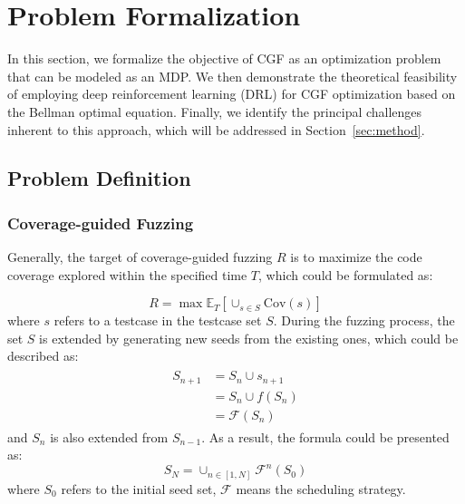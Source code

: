 \documentclass[lettersize,journal]{IEEEtran}
\begin{document}
\newpage



\section{Problem Formalization}\label{sec:background}

In this section, we formalize the objective of CGF as an optimization problem that can be modeled as an MDP. We then demonstrate the theoretical feasibility of employing deep reinforcement learning (DRL) for CGF optimization based on the Bellman optimal equation. Finally, we identify the principal challenges inherent to this approach, which will be addressed in Section \ref{sec:method}. 

\subsection{Problem Definition}

\subsubsection{Coverage-guided Fuzzing}

Generally, the target of coverage-guided fuzzing $R$ is to maximize the code coverage explored within the specified time $T$, which could be formulated as:

\begin{equation}
	R = \max \mathbb{E}_{T}\left[\cup_{s\in S}\text{Cov}(s)\right]\label{eq:cgf_target}
\end{equation}
where $s$ refers to a testcase in the testcase set $S$. During the fuzzing process, the set $S$ is extended by generating new seeds from the existing ones, which could be described as:
\begin{align}
	\begin{split}
		S_{n+1} &= S_{n}\cup s_{n+1} \\
		&= S_n\cup f(S_{n}) \\
		&= \mathcal{F}(S_n)
	\end{split}
\end{align}
and $S_n$ is also extended from $S_{n-1}$. As a result, the formula could be presented as:
\begin{equation}
	S_{N} = \cup_{n\in[1, N]}\mathcal{F}^n(S_0)
\end{equation}
where $S_0$ refers to the initial seed set, $\mathcal{F}$ means the scheduling strategy.
\end{document}

